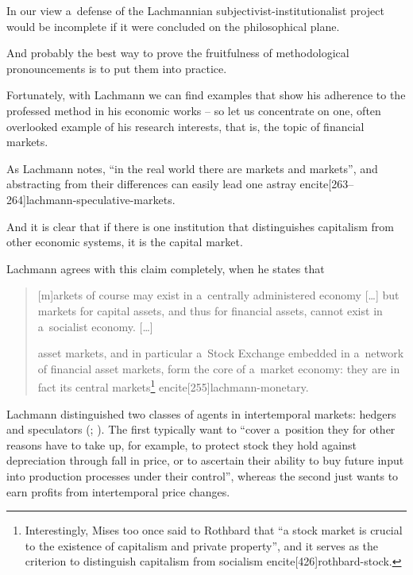 {\label{sec:finance}



In our view a~defense of the Lachmannian subjectivist-institutionalist project would be incomplete if it were concluded on the philosophical plane.

And probably the best way to prove the fruitfulness of methodological pronouncements is to put them into practice.

Fortunately, with Lachmann we can find examples that show his adherence to the professed method in his economic works -- so let us concentrate on one, often overlooked example of his research interests, that is, the topic of financial markets.



As Lachmann notes, ``in the real world there are markets and markets'', and abstracting from their differences can easily lead one astray encite[263--264]{lachmann-speculative-markets}.

And it is clear that if there is one institution that distinguishes capitalism from other economic systems, it is the capital market.

Lachmann agrees with this claim completely, when he states that

\begin{quote}

[m]arkets of course may exist in a~centrally administered economy [\ldots] but markets for capital assets, and thus for financial assets, cannot exist in a~socialist economy. [\ldots]

asset markets, and in particular a~Stock Exchange embedded in a~network of financial asset markets, form the core of a~market economy: they are in fact its central markets\footnote{Interestingly, Mises too once said to Rothbard that ``a stock market is crucial to the existence of capitalism and private property'', and it serves as the criterion to distinguish capitalism from socialism encite[426]{rothbard-stock}.} encite[255]{lachmann-monetary}.

\end{quote}



Lachmann distinguished two classes of agents in intertemporal markets: hedgers and speculators (\cite[10]{lachmann1986market}; \citeyear[264--265]{lachmann-speculative-markets}). The first typically want to ``cover a~position they for other reasons have to take up, for example, to protect stock they hold against depreciation through fall in price, or to ascertain their ability to buy future input into production processes under their control'', whereas the second just wants to earn profits from intertemporal price changes.

}
